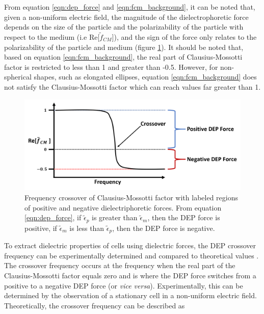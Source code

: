 \par From equation \ref{eqn:dep_force} and \ref{eqn:fcm_background}, it can be noted that, given a non-uniform electric field, the magnitude of the dielectrophoretic force depends on the size of the particle and the polarizability of the particle with respect to the medium (i.e Re$\big[\tilde{f}_{CM}\big]$), and the sign of the force only relates to the polarizability of the particle and medium (figure \ref{fig:freq_crossover}). It should be noted that, based on equation \ref{eqn:fcm_background}, the real part of Clausius-Mossotti factor is restricted to less than 1 and greater than -0.5. However, for non-spherical shapes, such as elongated ellipses, equation \ref{eqn:fcm_background} does not satisfy the Clausius-Mossotti factor which can reach values far greater than 1.  


\begin{figure}[ht]
 \centering
 \includegraphics[width=\textwidth]{images/DEPCrossover.png}
 \caption[Frequency crossover of Clausius-Mossotti factor] {Frequency crossover of Clausius-Mossotti factor with labeled regions of positive and negative dielectriphoretic forces. From equation \ref{eqn:dep_force}, if $\tilde{\epsilon}_p$ is greater than $\tilde{\epsilon}_m$, then the DEP force is positive, if $\tilde{\epsilon}_m$ is less than $\tilde{\epsilon}_p$, then the DEP force is negative.}
 \label{fig:freq_crossover}
\end{figure}
 
 \par To extract dielectric properties of cells using dielectric forces, the DEP crossover frequency can be experimentally determined and compared to theoretical values \cite{morgan_single_2007}. The crossover frequency occurs at the frequency when the real part of the Clausius-Mossotti factor equals zero and is where the DEP force switches from a positive to a negative DEP force (or \textit{vice versa}). Experimentally, this can be determined by the observation of a stationary cell in a non-uniform electric field. Theoretically, the crossover frequency can be described as
 
